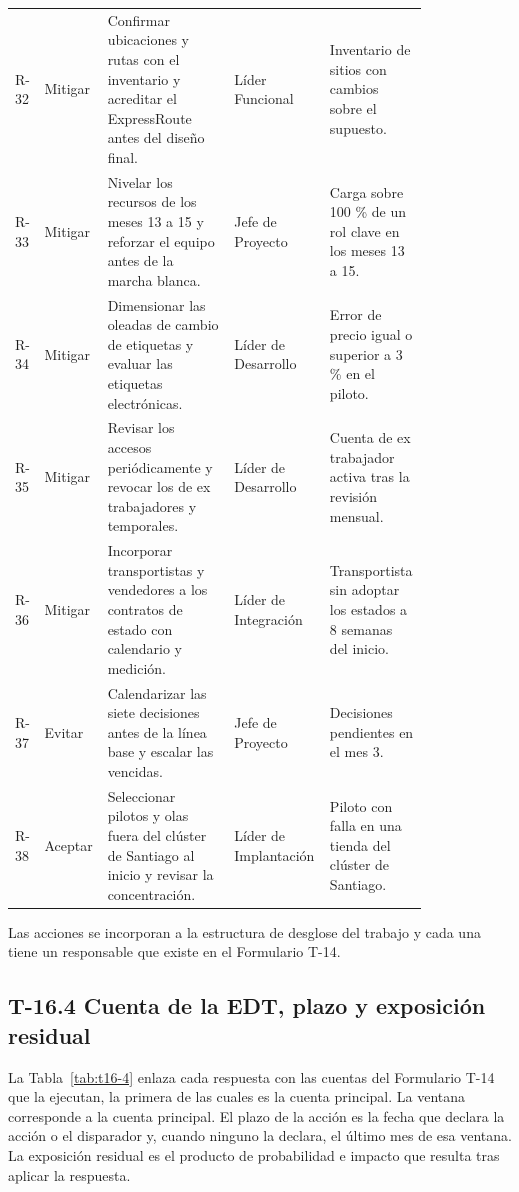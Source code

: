\documentclass[11pt]{article}
\begin{document}
\begin{longtable}{p{0.060\linewidth}p{0.100\linewidth}p{0.300\linewidth}p{0.170\linewidth}p{0.190\linewidth}}
R-32 & Mitigar & Confirmar ubicaciones y rutas con el inventario y acreditar el ExpressRoute antes del diseño final. & Líder Funcional & Inventario de sitios con cambios sobre el supuesto. \\
R-33 & Mitigar & Nivelar los recursos de los meses 13 a 15 y reforzar el equipo antes de la marcha blanca. & Jefe de Proyecto & Carga sobre 100 \% de un rol clave en los meses 13 a 15. \\
R-34 & Mitigar & Dimensionar las oleadas de cambio de etiquetas y evaluar las etiquetas electrónicas. & Líder de Desarrollo & Error de precio igual o superior a 3 \% en el piloto. \\
R-35 & Mitigar & Revisar los accesos periódicamente y revocar los de ex trabajadores y temporales. & Líder de Desarrollo & Cuenta de ex trabajador activa tras la revisión mensual. \\
R-36 & Mitigar & Incorporar transportistas y vendedores a los contratos de estado con calendario y medición. & Líder de Integración & Transportista sin adoptar los estados a 8 semanas del inicio. \\
R-37 & Evitar & Calendarizar las siete decisiones antes de la línea base y escalar las vencidas. & Jefe de Proyecto & Decisiones pendientes en el mes 3. \\
R-38 & Aceptar & Seleccionar pilotos y olas fuera del clúster de Santiago al inicio y revisar la concentración. & Líder de Implantación & Piloto con falla en una tienda del clúster de Santiago. \\
\end{longtable}

Las acciones se incorporan a la estructura de desglose del trabajo y cada una tiene un responsable que existe en el Formulario T-14.

\subsection{T-16.4 Cuenta de la EDT, plazo y exposición residual}

La Tabla~\mbox{\ref{tab:t16-4}} enlaza cada respuesta con las cuentas del Formulario T-14 que la ejecutan, la primera de las cuales es la cuenta principal. La ventana corresponde a la cuenta principal. El plazo de la acción es la fecha que declara la acción o el disparador y, cuando ninguno la declara, el último mes de esa ventana. La exposición residual es el producto de probabilidad e impacto que resulta tras aplicar la respuesta.
\end{document}
